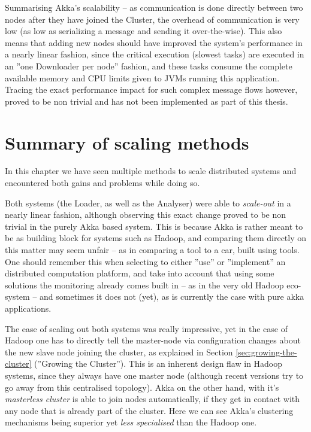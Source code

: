 Summarising Akka's scalability -- as communication is done directly between two nodes after they have joined the Cluster, the overhead of communication is very low (as low as serializing a message and sending it over-the-wise). This also means that adding new nodes should have improved the system's performance in a nearly linear fashion, since the critical execution (slowest tasks) are executed in an ''one Downloader per node'' fashion, and these tasks consume the complete available memory and CPU limits given to JVMs running this application. Tracing the exact performance impact for such complex message flows however, proved to be non trivial and has not been implemented as part of this thesis.



\section{Summary of scaling methods}
\label{sec:scaling-summary}

In this chapter we have seen multiple methods to scale distributed systems and encountered both gains and problems while doing so.

Both systems (the Loader, as well as the Analyser) were able to \textit{scale-out} in a nearly linear fashion, although observing this exact change proved to be non trivial in the purely Akka based system. This is because Akka is rather meant to be as building block for systems such as Hadoop, and comparing them directly on this matter may seem unfair -- as in comparing a tool to a car, built using tools. One should remember this when selecting to either ''use'' or ''implement'' an distributed computation platform, and take into account that using some solutions the monitoring already comes built in -- as in the very old Hadoop eco-system -- and sometimes it does not (yet), as is currently the case with pure akka applications.

The ease of scaling out both systems was really impressive, yet in the case of Hadoop one has to directly tell the master-node via configuration changes about the new slave node joining the cluster, as explained in Section \ref{sec:growing-the-cluster} (''Growing the Cluster''). This is an inherent design flaw in Hadoop systems, since they always have one master node (although recent versions try to go away from this centralised topology). Akka on the other hand, with it's \textit{masterless cluster} is able to join nodes automatically, if they get in contact with any node that is already part of the cluster. Here we can see Akka's clustering mechanisms being superior yet \textit{less specialised} than the Hadoop one.

